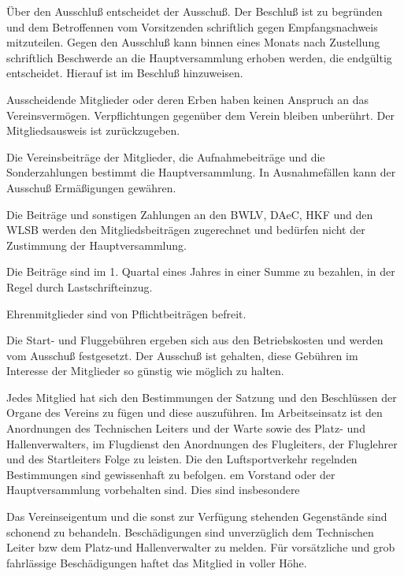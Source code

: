 \documentclass[10pt,a4paper,parskip=half]{scrartcl}
\begin{document}
\begin{contract}
\begin{multicols}{2}
    Über den Ausschluß entscheidet der Ausschuß.
    Der Beschluß ist zu begründen und dem Betroffennen vom Vorsitzenden schriftlich gegen Empfangsnachweis mitzuteilen.
    Gegen den Ausschluß kann binnen eines Monats nach Zustellung schriftlich Beschwerde an die
    Hauptversammlung erhoben werden,
    die endgültig entscheidet.
    Hierauf ist im Beschluß hinzuweisen.
    
    Ausscheidende Mitglieder oder deren Erben haben keinen Anspruch an das Vereinsvermögen.
    Verpflichtungen gegenüber dem Verein bleiben unberührt.
    Der Mitgliedsausweis ist zurückzugeben.
    
    Die Vereinsbeiträge der Mitglieder,
    die Aufnahmebeiträge und die Sonderzahlungen bestimmt die Hauptversammlung.
    In Ausnahmefällen kann der Ausschuß Ermäßigungen gewähren.
    
    Die Beiträge und sonstigen Zahlungen an den BWLV,
    DAeC,
    HKF und den WLSB werden den Mitgliedsbeiträgen zugerechnet und bedürfen nicht der Zustimmung der Hauptversammlung.
    
    Die Beiträge sind im 1. Quartal eines Jahres in einer Summe zu bezahlen,
    in der Regel durch Lastschrifteinzug.
    
    Ehrenmitglieder sind von Pflichtbeiträgen befreit.
    
    Die Start- und Fluggebühren ergeben sich aus den Betriebskosten und werden vom Ausschuß festgesetzt.
    Der Ausschuß ist gehalten,
    diese Gebühren im Interesse der Mitglieder so günstig wie möglich zu halten.
    
    
    Jedes Mitglied hat sich den Bestimmungen der Satzung und den Beschlüssen der Organe des Vereins zu fügen und diese auszuführen.
    Im Arbeitseinsatz ist den Anordnungen des Technischen Leiters und der Warte sowie des Platz- und Hallenverwalters,
    im Flugdienst den Anordnungen des Flugleiters,
    der Fluglehrer und des Startleiters Folge zu leisten.
    Die den Luftsportverkehr regelnden Bestimmungen sind gewissenhaft zu befolgen.
    em Vorstand oder der Hauptversammlung vorbehalten sind.
    Dies sind insbesondere
    \begin{enumerate}[label=\alph*),noitemsep]
    Das Vereinseigentum und die sonst zur Verfügung stehenden Gegenstände sind schonend zu behandeln.
    Beschädigungen sind unverzüglich dem Technischen Leiter bzw dem Platz-und Hallenverwalter zu melden.
    Für vorsätzliche und grob fahrlässige Beschädigungen haftet das Mitglied in voller Höhe.
    

\end{enumerate}
\end{multicols}
\end{contract}
\end{document}
